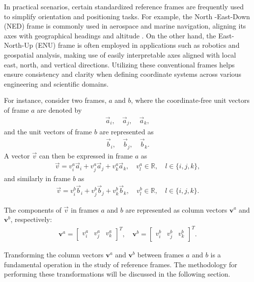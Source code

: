 In practical scenarios, certain standardized reference frames are frequently
used to simplify orientation and positioning tasks. For example, the North
-East-Down (NED) frame is commonly used in aerospace and marine navigation,
aligning its axes with geographical headings and altitude \cite{fossen2021}.
On the other hand, the East-North-Up (ENU) frame is often employed in
applications such as robotics and geospatial analysis, making use of easily
interpretable axes aligned with local east, north, and vertical directions.
Utilizing these conventional frames helps ensure consistency and clarity when
defining coordinate systems across various engineering and scientific domains.

For instance, consider two frames, \(a\) and \(b\), where the coordinate-free
unit vectors of frame \(a\) are denoted by  
\begin{align}
\vec{a}_i, \quad \vec{a}_j, \quad \vec{a}_k,
\end{align}  
and the unit vectors of frame \(b\) are represented as  
\begin{align}
\vec{b}_i, \quad \vec{b}_j, \quad \vec{b}_k.
\end{align}  
A vector \(\vec{v}\) can then be expressed in frame \(a\) as  
\begin{align}
\vec{v} = v^a_i \vec{a}_i + v^a_j \vec{a}_j + v^a_k \vec{a}_k, \quad v^a_l \in \mathbb{R}, \quad l \in \{i, j, k\},
\end{align}  
and similarly in frame \(b\) as  
\begin{align}
\vec{v} = v^b_i \vec{b}_i + v^b_j \vec{b}_j + v^b_k \vec{b}_k, \quad v^b_l \in \mathbb{R}, \quad l \in \{i, j, k\}.
\end{align}  

The components of \(\vec{v}\) in frames \(a\) and \(b\) are represented as column vectors \(\bm{v}^a\) and \(\bm{v}^b\), respectively:  
\begin{align}
\bm{v}^a = \begin{bmatrix} v^a_i & v^a_j & v^a_k \end{bmatrix}^T, \quad  
\bm{v}^b = \begin{bmatrix} v^b_i & v^b_j & v^b_k \end{bmatrix}^T.
\end{align}  

Transforming the column vectors \(\bm{v}^a\) and \(\bm{v}^b\) between frames
\(a\) and \(b\) is a fundamental operation in the study of reference frames.
The methodology for performing these transformations will be discussed in
the following section.  

